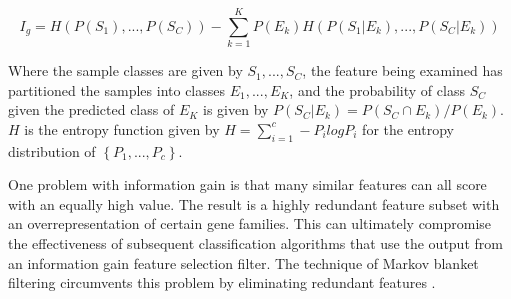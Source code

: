 \begin{equation}\label{sam}
I_g = H \left (  P \left ( S_1  \right ), ..., P \left ( S_C  \right )  \right ) -  \sum_{ k=1 }^{ K } P  \left ( E_k  \right ) H  \left ( P \left (  S_1 | E_k \right ),..., P \left (  S_C | E_k \right )  \right )  
\end{equation}

Where the sample classes are given by $S_1,...,S_C$, the feature being examined
has partitioned the samples into classes $E_1,...,E_K$, and the probability of
class $S_C$ given the predicted class of $E_K$ is given by $P \left ( S_C | E_k
\right) = P \left ( S_C  \cap  E_k \right) / P \left ( E_k \right) $.  $H$ is
the entropy function given by $H = \sum_{ i=1 }^{ c } - P_i log P_i$ for the
entropy distribution of $\left\{ P_1,...,P_c \right\}$.

One problem with information gain is that many similar features can all score with
an equally high value.  The result is a highly redundant
feature subset with an overrepresentation of certain gene families.  This can
ultimately compromise the effectiveness of subsequent classification algorithms
that use the output from an information gain feature selection filter.  The
technique of Markov blanket filtering circumvents this problem by eliminating
redundant features \cite{koller1996tof}. 


